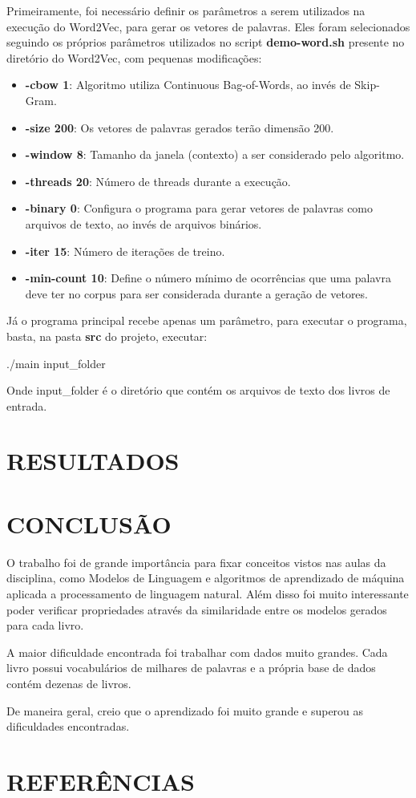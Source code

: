 \documentclass[12pt]{article}
\begin{document}
Primeiramente, foi necessário definir os parâmetros a serem utilizados na execução do Word2Vec,
para gerar os vetores de palavras. Eles foram selecionados seguindo os próprios parâmetros
utilizados no script \textbf{demo-word.sh} presente no diretório do Word2Vec, com pequenas
modificações:

\begin{itemize}
 \item \textbf{-cbow 1}: Algoritmo utiliza Continuous Bag-of-Words, ao invés de Skip-Gram.
 \item \textbf{-size 200}: Os vetores de palavras gerados terão dimensão 200.
 \item \textbf{-window 8}: Tamanho da janela (contexto) a ser considerado pelo algoritmo.
 \item \textbf{-threads 20}: Número de threads durante a execução.
 \item \textbf{-binary 0}: Configura o programa para gerar vetores de palavras como arquivos
 de texto, ao invés de arquivos binários.
 \item \textbf{-iter 15}: Número de iterações de treino.
 \item \textbf{-min-count 10}: Define o número mínimo de ocorrências que uma palavra deve ter 
 no corpus para ser considerada durante a geração de vetores.
\end{itemize}

Já o programa principal recebe apenas um parâmetro, para executar o programa, basta, na pasta
\textbf{src} do projeto, executar:

\begin{center}
 ./main input\_folder
\end{center}

Onde input\_folder é o diretório que contém os arquivos de texto dos livros de entrada.

\section{RESULTADOS}


\section{CONCLUSÃO}

O trabalho foi de grande importância para fixar conceitos vistos nas aulas da disciplina, como
Modelos de Linguagem e algoritmos de aprendizado de máquina aplicada a processamento de linguagem
natural. Além disso foi muito interessante poder verificar propriedades através da similaridade entre
os modelos gerados para cada livro.

A maior dificuldade encontrada foi trabalhar com dados muito grandes. Cada livro possui vocabulários
de milhares de palavras e a própria base de dados contém dezenas de livros.

De maneira geral, creio que o aprendizado foi muito grande e superou as dificuldades encontradas.

\section{REFERÊNCIAS}



\end{document}
